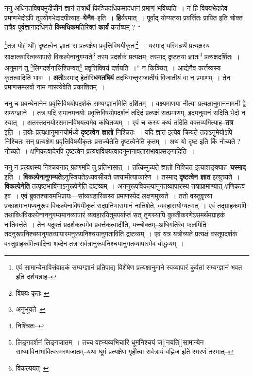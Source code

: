 \documentclass[article,12pt,a4paper]{memoir}
\newcommand{\unclear}[1]{($^{?}$#1)}
\begin{document}
	  \pstart ननु अधिगतविषयमुदीचीनं ज्ञानं तत्रार्थे किञ्चिदधिकमादधानं प्रमाणं भविष्यति । न हि विषयभेदादेव प्रमाणभेदोऽपि तूपयोगभेदादपीत्याह--\textbf{येनैव}--इति । \textbf{हि}र्यरमात् । पूर्वाद् योग्यतया प्रवर्त्तितः प्रापित इति चोक्तं तत्रैव पूर्वज्ञानादधिगते \textbf{किमधिकम}तिरिक्तं \textbf{कार्यं} कर्त्तव्यम् ?  \leavevmode{} “
	  
	\footnote{एवं सामान्येनाविसंवादकं सम्यग्ज्ञानं प्रतिपाद्य विशेषेण प्रत्यक्षानुमाने स्वव्यापारं कुर्वतां सम्यग्ज्ञानं भवत इति दर्शयन्नाह--\cite{dp-msD-n}}तत्र यो\unclear{र्थो} दृष्टत्वेन ज्ञातः स प्रत्यक्षेण प्रवृत्तिविषयीकृतः\footnote{विषयः कृतः \cite{dp-msB} \cite{dp-msC} \cite{dp-msD}} । यस्माद् यस्मिन्नर्थे प्रत्यक्षस्य साक्षात्कारित्वव्यापारो विकल्पेनानुगम्यते\footnote{अनुभूयते--\cite{dp-msD-n}} तस्य प्रदर्शकं प्रत्यक्षम्; तस्माद् दृष्टतया ज्ञातः\footnote{निश्चितः--\cite{dp-msD-n}} प्रत्यक्षदर्शितः । अनुमानं तु \footnote{लिङ्गदर्शनं लिङ्गजातम् । तच्च वह्न्यव्यभिचारि धूमनिश्चयं ज[[नयति]]सामान्येन साध्याविनाभावित्वस्मरणजातम्--यथा धूमं प्रत्यक्षेण गृहीत्वा सर्वत्रायं वह्निज इति स्मरणं तस्मात्--\cite{dp-msD-n}}लिगदर्शनान्निंश्चिन्वत्\footnote{विकल्पयत्--\cite{dp-msD-n}} प्रवृत्तिविषयं दर्शयति ।” न किञ्चित् । आद्येनैव कर्त्तव्यस्य कृतत्वादिति भावः । \textbf{अतो}ऽस्माद् हेतोरि\textbf{धगतषियं} तदधिगन्तृसजातीयं विजातीयं वा न प्रमाणम् । तेन प्रमाणसम्प्लवो नाम नास्त्येवेति प्रकाशितम् ।
	\pend
      

	  \pstart ननु च प्रबन्धेनानेन प्रवृत्तिविषयोपदर्शकं सम्थग्ज्ञानमिति दर्शितम् । वक्ष्यमाणया नीत्या प्रत्यक्षानुमाननामनी द्वे सम्यग्ज्ञाने । तत्र यदि समानमनयोः प्रवृत्तिविषयोपदर्शनं तदिदं प्रत्यक्षं सत्प्रमाणम्, इदमनुमानं सदिति भेदो न स्यात् । अतस्तदनयोरसमानविषयत्वमेव कथितव्यम् । एवं च कस्य कथं तदिति वक्तव्यमित्याह--\textbf{तत्र} इति । तयोः प्रत्यक्षानुमानयोर्मध्ये \textbf{दृष्टत्वेन ज्ञातो} निश्चितः । यदि ज्ञात इत्येव क्रियते तदाऽनुमेयोऽपि निश्चितः सन् प्रत्यक्षेण प्रवृत्तिविषयीकृतः प्रसज्येतेति दृष्टत्वेनेति कृतम् । अथ यो दृष्ट इति किं नोच्यते ? नोच्यते । क्षणिकत्वादेरपि दृष्टत्वेन प्रत्यक्षविषयत्वादनुमानावताराभावप्रसङ्गादिति ।
	\pend
      

	  \pstart ननु न प्रत्यक्षस्य निश्चयनाद् ग्रहणमपि तु प्रतिभासात् । तत्किमुच्यते ज्ञातो निश्चित इत्याशङ्क्याह--\textbf{यस्माद्} इति । \textbf{विकल्पेनानुगम्यते}ऽनुस्त्रियतेऽध्यवसीयते पश्यामीत्याकारेण । तस्माद् \textbf{दृष्टत्वेन ज्ञात} इत्युच्यते । \textbf{विकल्पेनेति} तत्पृष्ठभाविनाऽनुरूपेणेति द्रष्टव्यम् । अननुरूपविकल्पानुगतव्यापारस्य तत्राप्रामाण्यात् क्षणिकत्व इव । एवं ब्रुवतश्चायमभिप्रायः—सांव्यवहारिकस्य प्रमाणस्येदं लक्ष\leavevmode{}णमुच्यते । ततो वस्तुवृत्त्या प्रकाशमानमप्यनुरूप विकल्पेनाविषयीकृतं सदप्रतिभासमानं नातिशेते, व्यवहारायोग्यत्वात् । एवं तद्ग्राहकमपि तथाविधविकल्पेनाननुगम्यमानव्यापारं व्यवहारयितुमपर्याप्तं सत् तृणस्यापि कुब्जीकरणेऽसमर्थमग्राहकं नातिवर्त्तते । तेन यदुक्तं प्रदर्शकत्वमेव प्रवर्त्तकत्वादीति, यच्चोक्तम्--अधिगतिरेव फलमिति तदनुरूपनिश्चयानुगतव्यापारमनुरूपनिश्चयानुगताविति द्रष्टव्यम् । एवं यत्र यत्रोच्यते प्रत्यक्षं वस्तूपदर्शकं वस्तुग्राहकमित्यादिना शब्देन तत्र सर्वत्रानुरूपनिश्चयानुगतव्यापारमेव बोद्धव्यम् ।
	\pend
      
\end{document}
